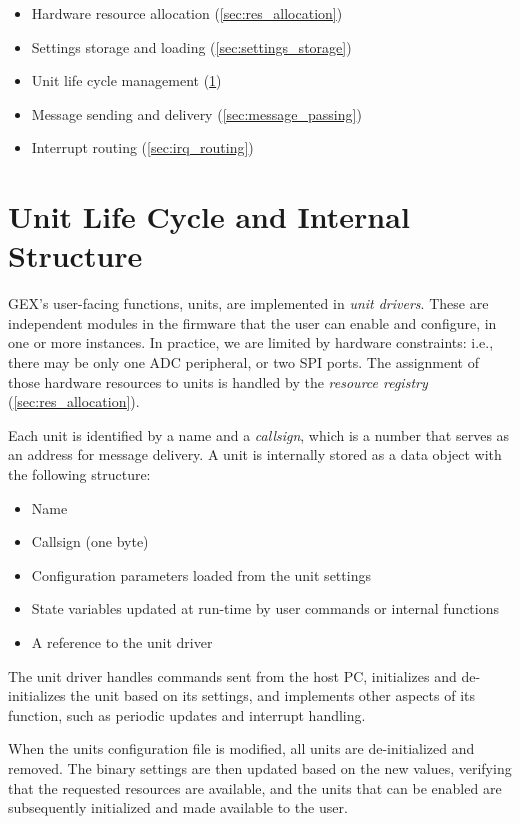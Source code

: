 \begin{itemize}[itemsep=0pt]
	\item Hardware resource allocation (\cref{sec:res_allocation})
	\item Settings storage and loading (\cref{sec:settings_storage})
	\item Unit life cycle management (\cref{sec:units_function})
	\item Message sending and delivery (\cref{sec:message_passing})
	\item Interrupt routing (\cref{sec:irq_routing})
\end{itemize}

\section{Unit Life Cycle and Internal Structure} \label{sec:units_function}

GEX's user-facing functions, units, are implemented in \textit{unit drivers}. These are independent modules in the firmware that the user can enable and configure, in one or more instances. In practice, we are limited by hardware constraints: i.e., there may be only one \gls{ADC} peripheral, or two \gls{SPI} ports. The assignment of those hardware resources to units is handled by the \textit{resource registry} (\cref{sec:res_allocation}).



Each unit is identified by a name and a \textit{callsign}, which is a number that serves as an address for message delivery. A unit is internally stored as a data object with the following structure:

\begin{itemize}[itemsep=0pt]
	\item Name
	\item Callsign (one byte)
	\item Configuration parameters loaded from the unit settings
	\item State variables updated at run-time by user commands or internal functions
	\item A reference to the unit driver
\end{itemize}

The unit driver handles commands sent from the host \gls{PC}, initializes and de-initializes the unit based on its settings, and implements other aspects of its function, such as periodic updates and interrupt handling. 

When the units configuration file is modified, all units are de-initialized and removed. The binary settings are then updated based on the new values, verifying that the requested resources are available, and the units that can be enabled are subsequently initialized and made available to the user.

